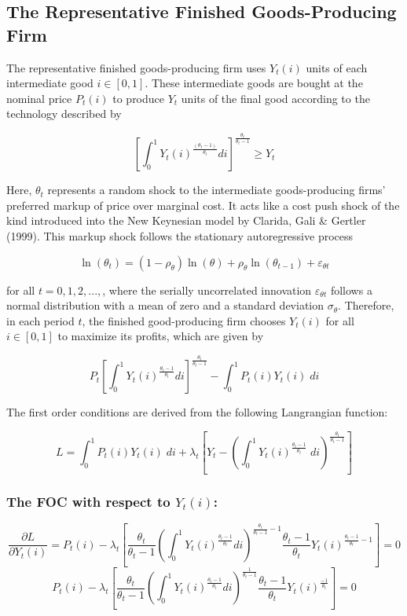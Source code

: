 \documentclass[11pt,preprint, authoryear]{elsarticle}
\numberwithin{equation}{section}
\numberwithin{figure}{section}
\numberwithin{table}{section}
\begin{document}
\hypertarget{the-representative-finished-goods-producing-firm}{%
\subsection{The Representative Finished Goods-Producing
Firm}\label{the-representative-finished-goods-producing-firm}}

The representative finished goods-producing firm uses \(Y_t(i)\) units
of each intermediate good \(i \in [0,1]\). These intermediate goods are
bought at the nominal price \(P_t(i)\) to produce \(Y_t\) units of the
final good according to the technology described by

\[[\int_0^1Y_t(i)^{\frac{(\theta_t-1)}{\theta_t}} di]^{\frac{\theta_t}{\theta_t-1}} \ge Y_t\]

Here, \(\theta_t\) represents a random shock to the intermediate
goods-producing firms' preferred markup of price over marginal cost. It
acts like a cost push shock of the kind introduced into the New
Keynesian model by Clarida, Gali \& Gertler (1999). This markup shock
follows the stationary autoregressive process

\[\ln(\theta_t)=(1-\rho_{\theta})\ln(\theta)+\rho_{\theta}\ln(\theta_{t-1})+\varepsilon_{\theta t} \tag{10}\]

for all \(t=0,1,2,...,\), where the serially uncorrelated innovation
\(\varepsilon_{\theta t}\) follows a normal distribution with a mean of
zero and a standard deviation \(\sigma_{\theta}\). Therefore, in each
period \(t\), the finished good-producing firm chooses \(Y_t(i)\) for
all \(i \in [0,1]\) to maximize its profits, which are given by

\[P_t[\int_0^1Y_t(i)^{\frac{\theta_t-1}{\theta_t}} di]^{\frac{\theta_t}{\theta_t-1}} - \int_0^1P_t(i)Y_t(i) \;di\]

The first order conditions are derived from the following Langrangian
function:

\[L = \int_0^1P_t(i)Y_t(i) \; di +\lambda_t[Y_t - (\int_0^1Y_t(i)^{\frac{\theta_t-1}{\theta_t}} \;di)^{\frac{\theta_t}{\theta_t-1}}]\]

\hypertarget{the-foc-with-respect-to-y_ti}{%
\subsubsection{\texorpdfstring{The FOC with respect to
\(Y_t(i)\):}{The FOC with respect to Y\_t(i):}}\label{the-foc-with-respect-to-y_ti}}

\[\frac{\partial L}{\partial Y_t(i)} = P_t(i) - \lambda_t[{\frac{\theta_t}{\theta_t-1}} (\int_0^1 Y_t(i)^{\frac{\theta_t-1}{\theta_t}} di)^{\frac{\theta_t}{\theta_t-1} -1} \frac{\theta_t-1}{\theta_t} Y_t(i)^{\frac{\theta_t-1}{\theta_t} -1}] = 0\]
\[P_t(i) - \lambda_t[{\frac{\theta_t}{\theta_t-1}} (\int_0^1 Y_t(i)^{\frac{\theta_t-1}{\theta_t}} di)^{\frac{1}{\theta_t-1}} \frac{\theta_t-1}{\theta_t} Y_t(i)^{\frac{-1}{\theta_t}}] = 0\]
\end{document}
